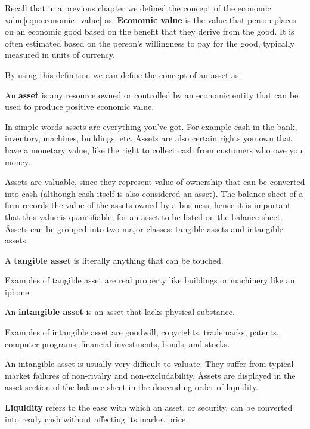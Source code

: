 Recall that in a previous chapter we defined the concept of the economic value\eqref{eqn:economic_value} as:
\textbf{Economic value} is the value that person places on an economic good based on the benefit that they derive
from the good. It is often estimated based on the person's willingness to pay for the good, typically measured in
units of currency.
\ed

By using this definition we can define the concept of an asset as:

\bd[Asset]
An \textbf{asset} is any resource owned or controlled by an economic entity that can be used to produce positive
economic value.
\ed

\be
In simple words assets are everything you've got. For example cash in the bank, inventory, machines, buildings, etc.
Assets are also certain rights you own that have a monetary value, like the right to collect cash from customers who
owe you money.
\ee

Assets are valuable, since they represent value of ownership that can be converted into cash (although cash itself is
also considered an asset). The balance sheet of a firm records the value of the assets owned by a business, hence it
is important that this value is quantifiable, for an asset to be listed on the balance sheet. \v

Assets can be grouped into two major classes: tangible assets and intangible assets.

A \textbf{tangible asset} is literally anything that can be touched.
\ed

\be
Examples of tangible asset are real property like buildings or machinery like an iphone.
\ee

An \textbf{intangible asset} is an asset that lacks physical substance.
\ed

\be
Examples of intangible asset are goodwill, copyrights, trademarks, patents, computer programs, financial investments,
bonds, and stocks.
\ee

An intangible asset is usually very difficult to valuate. They suffer from typical market failures of non-rivalry and
non-excludability. \v

Assets are displayed in the asset section of the balance sheet in the descending order of liquidity.

\bd[Liquidity]
\textbf{Liquidity} refers to the ease with which an asset, or security, can be converted into ready cash without
affecting its market price.
\ed

